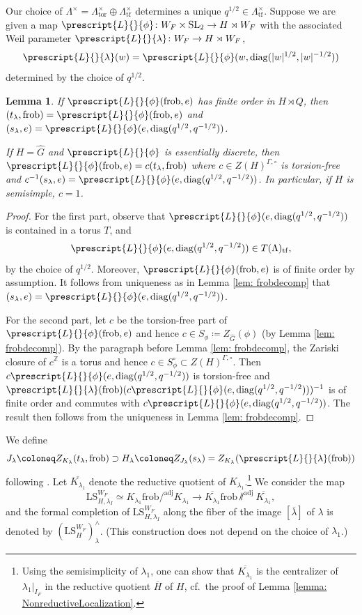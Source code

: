 \documentclass{amsart}
\newtheorem{lemma}[theorem]{Lemma}
\theoremstyle{definition}
\theoremstyle{remark}
\numberwithin{equation}{section}
\newcommand{\Z}{\mathbb{Z}}
\newcommand{\SL}{\mathrm{SL}}
\newcommand{\co}[1]{\prescript{#1}{}}
\newcommand{\wh}{\widehat}
\newcommand{\frob}{\mathrm{frob}}
\newcommand{\diag}{\mathrm{diag}}
\newcommand{\tor}{\mathrm{tor}}
\newcommand{\tf}{\mathrm{tf}}
\newcommand{\LS}{\mathrm{LS}}
\newcommand{\adj}{\mathrm{adj}}
\begin{document}
Our choice of $\Lambda^\times= \Lambda_{\tor}^{\times}\oplus \Lambda_{\tf}^{\times}$ determines a unique $q^{1/2}\in \Lambda_{\tf}^{\times}$. Suppose we are given a map $\co{L}{\phi}\colon W_F\times \SL_2\to H\rtimes W_F$ with the associated Weil parameter $\co{L}{\lambda}\colon W_F\to H \rtimes W_F$, 
\[
\co{L}{\lambda}(w)=\co{L}{\phi}(w, \diag(\lvert w\rvert^{1/2}, \lvert w\rvert^{-1/2}))
\]
determined by the choice of $q^{1/2}$. 

\begin{lemma}{\label{lem: tftorsdisclemma}}
If $\co{L}{\phi}(\frob, e)$ has finite order in $H\rtimes Q$, then $(t_\lambda, \frob)= \co{L}{\phi}(\frob, e)$ and $(s_\lambda, e)=\co{L}{\phi}(e, \diag(q^{1/2}, q^{-1/2}))$. 

If $H=\wh G$ and $\co{L}{\phi}$ is essentially discrete, then $\co{L}{\phi}(\frob,e) = c(t_{\lambda}, \frob)$ where $c \in Z(H)^{\Gamma, \circ}$ is torsion-free and $c^{-1}(s_\lambda, e)=\co{L}{\phi}(e, \diag(q^{1/2}, q^{-1/2}))$. In particular, if $H$ is semisimple, $c=1$.
\end{lemma}

\begin{proof}
For the first part, observe that $\co{L}{\phi}(e, \diag(q^{1/2}, q^{-1/2}))$ is contained in a torus $T$, and 
\[
\co{L}{\phi}(e, \diag(q^{1/2}, q^{-1/2}))\in T(\Lambda)_{\tf},
\]
by the choice of $q^{1/2}$. Moreover, $\co{L}{\phi}(\frob, e)$ is of finite order by assumption. It follows from uniqueness as in Lemma \ref{lem: frobdecomp} that $(s_\lambda, e)=\co{L}{\phi}(e, \diag(q^{1/2}, q^{-1/2}))$. 

For the second part, let $c$ be the torsion-free part of $\co{L}{\phi}(\frob, e)$ and hence $c \in S_{\phi}\coloneq Z_{\wh G}(\phi)$ (by Lemma \ref{lem: frobdecomp}). By the paragraph before Lemma \ref{lem: frobdecomp}, the Zariski closure of $c^\Z$ is a torus and hence $c \in S^{\circ}_{\phi} \subset Z(H)^{\Gamma, \circ}$. Then $c \co{L}{\phi}(e, \diag(q^{1/2}, q^{-1/2}))$ is torsion-free and $\co{L}{\lambda}(\frob)(c \co{L}{\phi}(e, \diag(q^{1/2}, q^{-1/2})))^{-1}$ is of finite order and commutes with $c \co{L}{\phi}(e, \diag(q^{1/2}, q^{-1/2}))$. The result then follows from the uniqueness in Lemma \ref{lem: frobdecomp}.
\end{proof}

We define 
\[
J_\lambda\coloneq Z_{K_\lambda}(t_\lambda, \frob) \supset  H_\lambda \coloneq Z_{J_\lambda} (s_\lambda)=Z_{K_\lambda} (\co{L}{\lambda}(\frob))
\]
following \cite[\S 5.3]{CFMMX}. Let $\overline{K_{\lambda_1}}$ denote the reductive quotient of $K_{\lambda_1}$.\footnote{Using the semisimplicity of $\lambda_1$, one can show that $\overline{K_{\lambda_1}}$ is the centralizer of $\lambda_1|_{I_F}$ in the reductive quotient $\overline{H}$ of $H$, cf.~the proof of Lemma \ref{lemma: NonreductiveLocalization}.}
We consider the map
\[
\LS_{H, \lambda_I}^{W_F} \simeq K_{\lambda_1} \frob /^\adj K_{\lambda_1} \to \overline{K_{\lambda_1}}\frob \sslash^\adj \overline{K_{\lambda_1}}, 
\]
and the formal completion of $\LS_{H, \lambda_I}^{W_F}$ along the fiber of the image $[\overline{\lambda}]$ of $\lambda$ is denoted by $(\LS_{H}^{W_F})^{\wedge}_\lambda$. (This construction does not depend on the choice of $\lambda_1$.)
\end{document}
